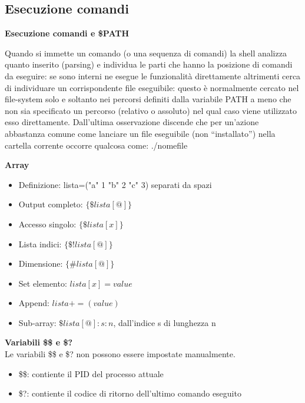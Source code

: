 \subsection{Esecuzione comandi}
\begin{flushleft}
  \textbf{Esecuzione comandi e \$PATH}\par
  Quando si immette un comando (o una sequenza di comandi) la shell analizza 
  quanto inserito (parsing) e individua le parti che hanno la posizione di comandi 
  da eseguire: se sono interni ne esegue le funzionalità direttamente altrimenti 
  cerca di individuare un corrispondente file eseguibile: questo è normalmente
  cercato nel file-system solo e soltanto nei percorsi definiti dalla variabile PATH a 
  meno che non sia specificato un percorso (relativo o assoluto) nel qual caso viene 
  utilizzato esso direttamente.
  Dall'ultima osservazione discende che per un'azione abbastanza comune come 
  lanciare un file eseguibile (non “installato”) nella cartella corrente occorre 
  qualcosa come: ./nomefile
\end{flushleft}
\begin{flushleft}
  \textbf{Array}\par 
  \begin{itemize}
    \item Definizione: lista=("a" 1 "b" 2 "c" 3) separati da spazi
    \item Output completo: $\{\$lista[@]\}$
    \item Accesso singolo: $\{\$lista[x]\}$
    \item Lista indici: $\{\$!lista[@]\}$
    \item Dimensione: $\{\#lista[@]\}$
    \item Set elemento: $lista[x] = value$
    \item Append: $lista+=(value)$
    \item Sub-array: $\$lista[@]:s:n$, dall'indice s di lunghezza n
  \end{itemize}
\end{flushleft}
\begin{flushleft}
  \textbf{Variabili \$\$ e \$?}\\
  Le variabili \$\$ e \$? non possono essere impostate manualmente.
  \begin{itemize}
    \item \$\$: contiente il PID del processo attuale
    \item \$?: contiente il codice di ritorno dell'ultimo comando eseguito
  \end{itemize}
\end{flushleft}
